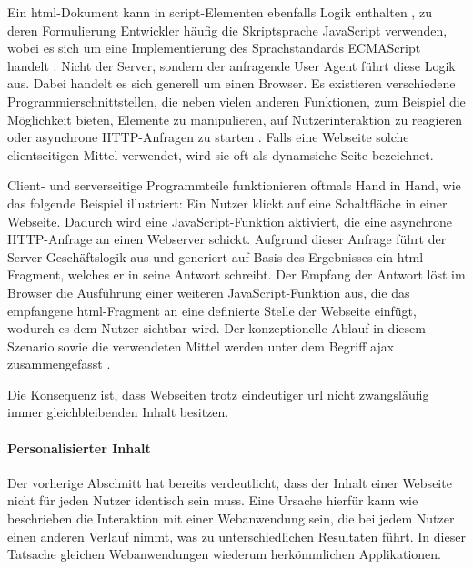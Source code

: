         Ein \gls{html}-Dokument kann in script-Elementen ebenfalls Logik enthalten
        \cite[Kapitel 4.11]{w3c:html5},
        zu deren Formulierung Entwickler häufig die Skriptsprache JavaScript verwenden,
        wobei es sich um eine Implementierung des Sprachstandards ECMAScript handelt
        \cite{ecma:ecmaScript}.
        Nicht der Server, sondern der anfragende User Agent führt diese Logik aus.
        Dabei handelt es sich generell um einen Browser.
        Es existieren verschiedene Programmierschnittstellen,
        die neben vielen anderen Funktionen, zum Beispiel die Möglichkeit bieten,
        Elemente zu manipulieren, auf Nutzerinteraktion zu reagieren
        oder asynchrone HTTP-Anfragen zu starten \cite[Kapitel 8]{whatwg:html}\cite{whatwg:xhr}.
        Falls eine Webseite solche clientseitigen Mittel verwendet,
        wird sie oft als dynamsiche Seite bezeichnet.
        
        Client- und serverseitige Programmteile funktionieren oftmals Hand in Hand,
        wie das folgende Beispiel illustriert:
        Ein Nutzer klickt auf eine Schaltfläche in einer Webseite.
        Dadurch wird eine JavaScript-Funktion aktiviert,
        die eine asynchrone HTTP-Anfrage an einen Webserver schickt.
        Aufgrund dieser Anfrage führt der Server Geschäftslogik aus
        und generiert auf Basis des Ergebnisses ein \gls{html}-Fragment,
        welches er in seine Antwort schreibt.
        Der Empfang der Antwort löst im Browser die Ausführung einer weiteren
        JavaScript-Funktion aus, die das empfangene \gls{html}-Fragment
        an eine definierte Stelle der Webseite einfügt,
        wodurch es dem Nutzer sichtbar wird.
        Der konzeptionelle Ablauf in diesem Szenario sowie die verwendeten Mittel
        werden unter dem Begriff \gls{ajax} zusammengefasst \cite{garrett:ajax}.

        Die Konsequenz ist, dass Webseiten trotz eindeutiger \gls{url} nicht zwangsläufig
        immer gleichbleibenden Inhalt besitzen.

        \paragraph*{Personalisierter Inhalt}
        Der vorherige Abschnitt hat bereits verdeutlicht,
        dass der Inhalt einer Webseite nicht für jeden Nutzer identisch sein muss.
        Eine Ursache hierfür kann wie beschrieben die Interaktion mit
        einer Webanwendung sein, die bei jedem Nutzer einen anderen Verlauf nimmt,
        was zu unterschiedlichen Resultaten führt.
        In dieser Tatsache gleichen Webanwendungen wiederum herkömmlichen Applikationen.

